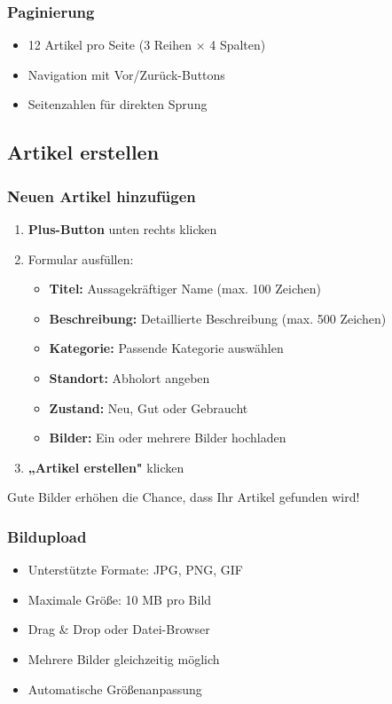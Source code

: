 \documentclass[a4paper,12pt]{article}
\begin{document}
\subsubsection{Paginierung}
\begin{itemize}
    \item 12 Artikel pro Seite (3 Reihen × 4 Spalten)
    \item Navigation mit Vor/Zurück-Buttons
    \item Seitenzahlen für direkten Sprung
\end{itemize}

\subsection{Artikel erstellen}

\subsubsection{Neuen Artikel hinzufügen}
\begin{enumerate}
    \item \textbf{Plus-Button} unten rechts klicken
    \item Formular ausfüllen:
    \begin{itemize}
        \item \textbf{Titel:} Aussagekräftiger Name (max. 100 Zeichen)
        \item \textbf{Beschreibung:} Detaillierte Beschreibung (max. 500 Zeichen)
        \item \textbf{Kategorie:} Passende Kategorie auswählen
        \item \textbf{Standort:} Abholort angeben
        \item \textbf{Zustand:} Neu, Gut oder Gebraucht
        \item \textbf{Bilder:} Ein oder mehrere Bilder hochladen
    \end{itemize}
    \item \textbf{„Artikel erstellen"} klicken
\end{enumerate}

\begin{tipbox}
Gute Bilder erhöhen die Chance, dass Ihr Artikel gefunden wird!
\end{tipbox}

\subsubsection{Bildupload}
\begin{itemize}
    \item Unterstützte Formate: JPG, PNG, GIF
    \item Maximale Größe: 10 MB pro Bild
    \item Drag \& Drop oder Datei-Browser
    \item Mehrere Bilder gleichzeitig möglich
    \item Automatische Größenanpassung
\end{itemize}
\end{document}
